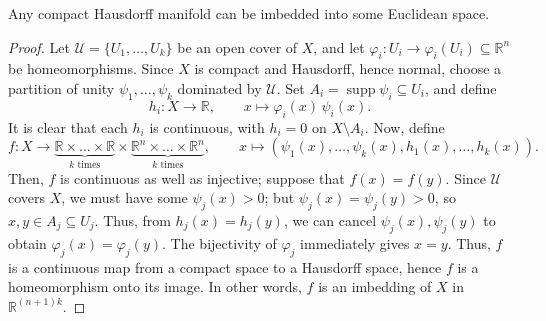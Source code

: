 \documentclass[11pt]{article}
\newcommand{\R}{\mathbb{R}}
\DeclareMathOperator{\supp}{supp}
\theoremstyle{definition}
\theoremstyle{remark}
\numberwithin{equation}{section}
\begin{document}
    \begin{theorem}
        Any compact Hausdorff manifold can be imbedded into some Euclidean space.
    \end{theorem}
    \begin{proof}
        Let $\mathscr{U} = \{U_1, \dots, U_k\}$ be an open cover of $X$, and let
        $\varphi_i\colon U_i \to \varphi_i(U_i) \subseteq \R^n$ be homeomorphisms.
        Since $X$ is compact and Hausdorff, hence normal, choose a partition of unity
        $\psi_1, \dots, \psi_k$ dominated by $\mathscr{U}$. Set $A_i = \supp{\psi_i}
        \subseteq U_i$, and define \[
            h_i\colon X \to \R, \qquad x\mapsto \varphi_i(x)\,\psi_i(x).
        \] It is clear that each $h_i$ is continuous, with $h_i = 0$ on $X \setminus
        A_i$. Now, define \[
            f\colon X \to \underbrace{\R \times \dots \times \R}_{k \text{ times}}\times 
            \underbrace{\R^n \times \dots \times \R^n}_{k \text{ times}}, \qquad
            x \mapsto (\psi_1(x), \dots, \psi_k(x), h_1(x), \dots, h_k(x)).
        \] Then, $f$ is continuous as well as injective; suppose that $f(x) = f(y)$.
        Since $\mathscr{U}$ covers $X$, we must have some $\psi_j(x) > 0$; but
        $\psi_j(x) = \psi_j(y) > 0$, so $x, y \in A_j \subseteq U_j$. Thus, from
        $h_j(x) = h_j(y)$, we can cancel $\psi_j(x), \psi_j(y)$ to obtain
        $\varphi_j(x) = \varphi_j(y)$. The bijectivity of $\varphi_j$ immediately
        gives $x = y$. Thus, $f$ is a continuous map from a compact space to a
        Hausdorff space, hence $f$ is a homeomorphism onto its image. In other words,
        $f$ is an imbedding of $X$ in $\R^{(n + 1)k}$.
    \end{proof}
\end{document}
